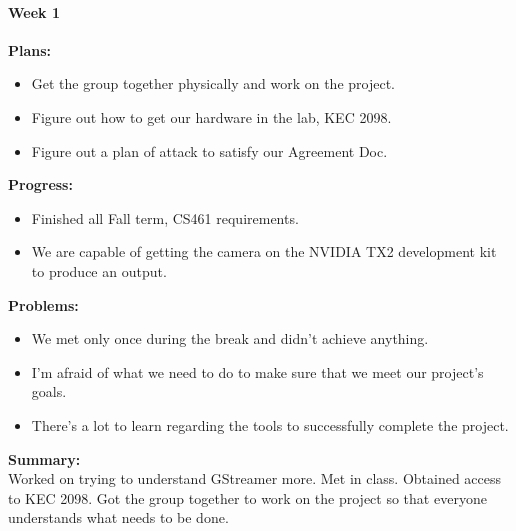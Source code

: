 \paragraph{Week 1}
\begin{adjustwidth}{2.5em}{0pt}
    \vspace{-0.5cm}\textbf{Plans:}
    \vspace{-0.5cm}
    \begin{itemize}
        \item Get the group together physically and work on the project. 
		\item Figure out how to get our hardware in the lab, KEC 2098. 
		\item Figure out a plan of attack to satisfy our Agreement Doc. 
    \end{itemize} 
    \vspace{-0.3cm}\textbf{Progress:}
    \vspace{-0.5cm}
    \begin{itemize}
        \item Finished all Fall term, CS461 requirements.
		\item We are capable of getting the camera on the NVIDIA TX2 development kit to produce an output. 
    \end{itemize} 
    \vspace{-0.3cm}\textbf{Problems:}
    \vspace{-0.5cm}
    \begin{itemize}
        \item We met only once during the break and didn't achieve anything.
		\item I'm afraid of what we need to do to make sure that we meet our project's goals. 
		\item There's a lot to learn regarding the tools to successfully complete the project. 
    \end{itemize}  
    \vspace{-0.3cm}\noindent\textbf{Summary:}\\
    \noindent Worked on trying to understand GStreamer more. Met in class. Obtained access to KEC 2098. Got the group together to work on the project so that everyone understands what needs to be done. 
\end{adjustwidth}

